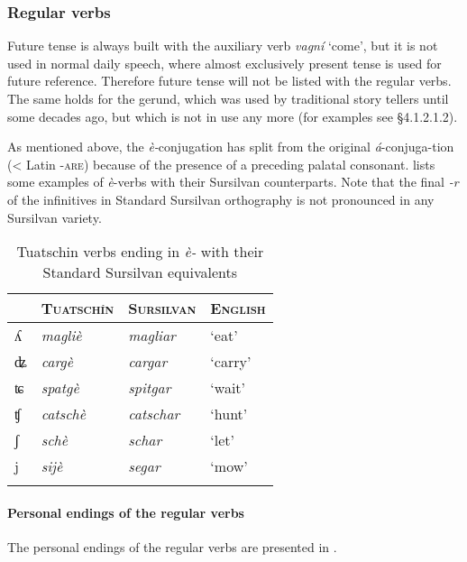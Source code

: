 \subsubsection{Regular verbs}
Future tense is always built with the auxiliary verb \textit{vagní} `come', but it is not used in normal daily speech, where almost exclusively present tense is used for future reference. Therefore future tense will not be listed with the regular verbs. The same holds for the gerund, which was used by traditional story tellers until some decades ago, but which is not in use any more (for examples see §4.1.2.1.2).

As mentioned above, the \textit{è-}conjugation has split from the original \textit{á}-conjuga-tion (< Latin \textsc{-are})  because of the presence of a preceding palatal consonant.  lists some examples of \textit{è}-verbs with their Sursilvan counterparts. Note that the final \textit{-r} of the infinitives in Standard Sursilvan orthography is not pronounced in any Sursilvan variety.

\begin{table}
\caption{Tuatschin verbs ending in \textit{è-} with their Standard Sursilvan equivalents}
\label{tab:èconj}
 \begin{tabular}{llll}
 \lsptoprule
&\textsc{Tuatschín}  & \textsc{Sursilvan}  & \textsc{English} \\
  \midrule
 ʎ & \textit{magliè} &\textit{magliar}& `eat' \\
ʥ&\textit{cargè}&\textit{cargar}&`carry'\\
ʨ&\textit{spatgè}&\textit{spitgar}&`wait'\\
ʧ&\textit{catschè}&\textit{catschar}&`hunt'\\
ʃ&\textit{schè}&\textit{schar}&`let'\\
j&\textit{sijè}&\textit{segar}&`mow'\\   
 \lspbottomrule
 \end{tabular}
\end{table}

\paragraph{Personal endings of the regular verbs}
The personal endings of the regular verbs are presented in .

